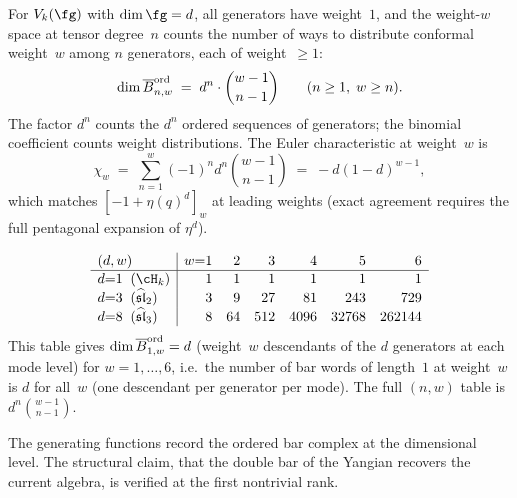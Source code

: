 \begin{computation}
\label{comp:affine-generator-dims}
For $V_k(\fg)$ with $\dim\fg=d$, all generators have
weight~$1$, and the weight-$w$ space at tensor degree~$n$
counts the number of ways to distribute conformal
weight~$w$ among $n$ generators, each of weight~$\ge 1$:
\[
\dim\overline{B}^{\mathrm{ord}}_{n,w}
\;=\;
d^n\cdot\binom{w-1}{n-1}
\qquad
(n\ge 1,\;w\ge n).
\]
The factor $d^n$ counts the $d^n$ ordered sequences of
generators; the binomial coefficient counts weight
distributions. The Euler characteristic at weight~$w$ is
\[
\chi_w
\;=\;
\sum_{n=1}^w (-1)^n d^n\binom{w-1}{n-1}
\;=\;
-d(1-d)^{w-1},
\]
which matches $[-1+\eta(q)^d]_w$ at leading weights
(exact agreement requires the full pentagonal expansion
of $\eta^d$).

\[
\renewcommand{\arraystretch}{1.05}
\begin{array}{l|rrrrrr}
(d,w) & w{=}1 & 2 & 3 & 4 & 5 & 6 \\
\hline
d{=}1\;\;(\cH_k) & 1 & 1 & 1 & 1 & 1 & 1 \\
d{=}3\;\;(\widehat{\mathfrak{sl}}_2) & 3 & 9 & 27 & 81 & 243 & 729 \\
d{=}8\;\;(\widehat{\mathfrak{sl}}_3) & 8 & 64 & 512 & 4096 & 32768 & 262144
\end{array}
\]
This table gives $\dim\overline{B}^{\mathrm{ord}}_{1,w}=d$
(weight~$w$ descendants of the $d$ generators at each mode level)
for $w=1,\ldots,6$, i.e.\ the number of bar words of
length~$1$ at weight~$w$ is $d$ for all~$w$ (one descendant per
generator per mode). The full $(n,w)$ table is
$d^n\binom{w-1}{n-1}$.
\end{computation}

The generating functions record the ordered bar complex at the
dimensional level. The structural claim, that the double bar of
the Yangian recovers the current algebra, is verified at the
first nontrivial rank.


